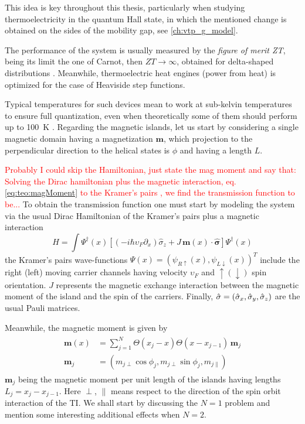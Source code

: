 This idea is key throughout this thesis, particularly when studying thermoelectricity in the quantum Hall state, in which the mentioned change is obtained on the sides of the mobility gap, see \ref{ch:vtp_g_model}.

The performance of the system is usually measured by the \textit{figure of merit ZT}, being its limit the one of Carnot, then $ZT \rightarrow{\infty}$, obtained for delta-shaped distributions \cite{mahan1996best}. Meanwhile, thermoelectric heat engines (power from heat) is optimized for the case of Heaviside step functions.

Typical temperatures for such devices mean to work at sub-kelvin temperatures to ensure full quantization, even when theoretically some of them should perform up to \SI{100}{\kelvin} \cite{pan2020probing}. Regarding the magnetic islands, let us start by considering a single magnetic domain having a magnetization $\textbf{m}$, which projection to the perpendicular direction to the helical states is $\phi$ and having a length $L$. 

\textcolor{red}{Probably I could skip the Hamiltonian, just state the mag moment and say that: Solving the Dirac hamiltonian plus the magnetic interaction, eq. \ref{eq:teo:magMoment} to the Kramer's pairs \cite{BustosMarun2013,Gresta2019,Gresta2021PhD}, we find the transmission function to be... }
To obtain the  transmission function one must start by modeling the system via the usual Dirac Hamiltonian of the Kramer's pairs plus a magnetic interaction
\begin{equation}
\label{eq:teo:hamiltonianQSH}
    \textit{H} = 
        \int{
        \Psi^\dagger(x)
        \left[ 
            \left( 
                -i\hbar \upsilon_F \partial_x
            \right) 
            \hat{\sigma}_z + J \, \textbf{m}(x) \cdot \hat{\boldsymbol{\sigma}}
        \right]
        \Psi^\dagger(x)
        }
\end{equation}
the Kramer's pairs wave-functions $ \Psi(x) = \left( \psi_{R \uparrow}(x),\psi_{L \downarrow}(x) \right)^T $ include the right (left) moving carrier channels having velocity $\upsilon_F$ and $\uparrow ( \downarrow )$ spin orientation. $J$ represents the magnetic exchange interaction between the magnetic moment of the island and the spin of the carriers. Finally, $\hat{\mathbf{ \sigma }} = \left( \hat{\sigma}_x,\hat{\sigma}_y, \hat{\sigma}_z \right)$ are the usual Pauli matrices.

Meanwhile, the magnetic moment is given by
\begin{align}
\begin{split}
\label{eq:teo:magMoment}
    \textbf{m}(x) &= \sum_{j=1}^N{\Theta(x_j - x)\Theta(x - x_{j-1}) \, \textbf{m}_j}\\
    \textbf{m}_j &= (m_{j\perp} \cos{\phi_j}, m_{j\perp} \sin{\phi_j}, m_{j\parallel}) 
\end{split}
\end{align}
%
$\textbf{m}_j$ being the magnetic moment per unit length of the islands having lengths $L_j = x_j - x_{j-1}$. Here $\perp$, $\parallel$ means respect to the direction of the spin orbit interaction of the TI. 
We shall start by discussing the $N = 1$ problem and mention some interesting additional effects when $N = 2$.

